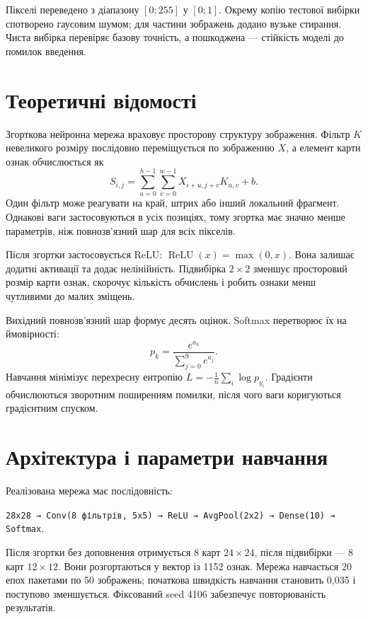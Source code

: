 \documentclass[12pt,a4paper]{article}
\begin{document}
Пікселі переведено з діапазону $[0;255]$ у $[0;1]$. Окрему копію тестової вибірки спотворено гаусовим шумом; для частини зображень додано вузьке стирання. Чиста вибірка перевіряє базову точність, а пошкоджена --- стійкість моделі до помилок введення.

\section{Теоретичні відомості}
Згорткова нейронна мережа враховує просторову структуру зображення. Фільтр $K$ невеликого розміру послідовно переміщується по зображенню $X$, а елемент карти ознак обчислюється як
\begin{equation}S_{i,j}=\sum_{u=0}^{h-1}\sum_{v=0}^{w-1}X_{i+u,j+v}K_{u,v}+b.\end{equation}
Один фільтр може реагувати на край, штрих або інший локальний фрагмент. Однакові ваги застосовуються в усіх позиціях, тому згортка має значно менше параметрів, ніж повнозв'язний шар для всіх пікселів.

Після згортки застосовується ReLU: $\operatorname{ReLU}(x)=\max(0,x)$. Вона залишає додатні активації та додає нелінійність. Підвибірка $2\times2$ зменшує просторовий розмір карти ознак, скорочує кількість обчислень і робить ознаки менш чутливими до малих зміщень.

Вихідний повнозв'язний шар формує десять оцінок. Softmax перетворює їх на ймовірності:
\begin{equation}p_k=\frac{e^{a_k}}{\sum_{j=0}^{9}e^{a_j}}.\end{equation}
Навчання мінімізує перехресну ентропію $L=-\frac1n\sum_i\log p_{y_i}$. Градієнти обчислюються зворотним поширенням помилки, після чого ваги коригуються градієнтним спуском.

\section{Архітектура і параметри навчання}
Реалізована мережа має послідовність:
\begin{center}\texttt{28x28 → Conv(8 фільтрів, 5x5) → ReLU → AvgPool(2x2) → Dense(10) → Softmax}.\end{center}
Після згортки без доповнення отримується 8 карт $24\times24$, після підвибірки --- 8 карт $12\times12$. Вони розгортаються у вектор із 1152 ознак. Мережа навчається 20 епох пакетами по 50 зображень; початкова швидкість навчання становить 0,035 і поступово зменшується. Фіксований seed 4106 забезпечує повторюваність результатів.
\end{document}
